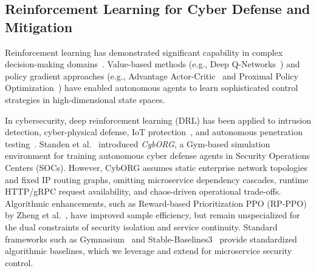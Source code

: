 \documentclass[ASNA,twocolumn]{USG}
\begin{document}
\subsection{Reinforcement Learning for Cyber Defense and Mitigation}
Reinforcement learning has demonstrated significant capability in complex decision-making domains~\cite{silver2016mastering, sutton1998reinforcement}. Value-based methods (e.g., Deep Q-Networks~\cite{mnih2015human}) and policy gradient approaches (e.g., Advantage Actor-Critic~\cite{mnih2016asynchronous} and Proximal Policy Optimization~\cite{schulman2017ppo}) have enabled autonomous agents to learn sophisticated control strategies in high-dimensional state spaces.

In cybersecurity, deep reinforcement learning (DRL) has been applied to intrusion detection, cyber-physical defense, IoT protection~\cite{xiao2018iot}, and autonomous penetration testing~\cite{nguyen2021deep, liu2025autonomous}. Standen et al.~\cite{standen2021cyborg} introduced \textit{CybORG}, a Gym-based simulation environment for training autonomous cyber defense agents in Security Operations Centers (SOCs). However, CybORG assumes static enterprise network topologies and fixed IP routing graphs, omitting microservice dependency cascades, runtime HTTP/gRPC request availability, and chaos-driven operational trade-offs. Algorithmic enhancements, such as Reward-based Prioritization PPO (RP-PPO) by Zheng et al.~\cite{zheng2025proximal}, have improved sample efficiency, but remain unspecialized for the dual constraints of security isolation and service continuity. Standard frameworks such as Gymnasium~\cite{towers2026gymnasium} and Stable-Baselines3~\cite{raffin2021stable} provide standardized algorithmic baselines, which we leverage and extend for microservice security control.
\end{document}
